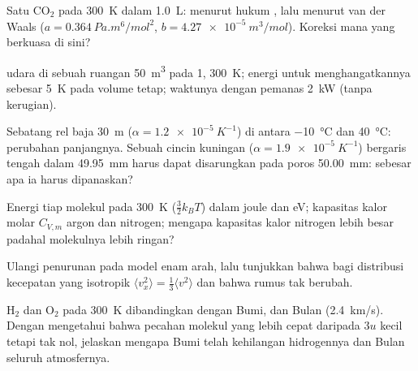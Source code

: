 \begin{exercise}[$\star\star$]\label{exo:b1:kinetic-theory:7}
Satu  CO$_2$ pada \qty{300}{K} dalam \qty{1.0}{L}:  menurut
hukum , lalu menurut van der Waals ($a = \qty{0.364}{Pa.m^6/mol^2}$,
$b = \qty{4.27e-5}{m^3/mol}$). Koreksi mana yang berkuasa di sini?
\end{exercise}

\begin{exercise}[$\star\star$]\label{exo:b1:kinetic-theory:8}
 udara di sebuah ruangan \qty{50}{m^3} pada \qty{1}{},
\qty{300}{K}; energi untuk menghangatkannya sebesar \qty{5}{K} pada volume tetap; waktunya
dengan pemanas \qty{2}{kW} (tanpa kerugian).
\end{exercise}

\begin{exercise}[$\star\star$]\label{exo:b1:kinetic-theory:9}
Sebatang rel baja \qty{30}{m} ($\alpha = \qty{1.2e-5}{K^{-1}}$) di antara
\qty{-10}{\degreeCelsius} dan \qty{40}{\degreeCelsius}: perubahan panjangnya.
Sebuah cincin kuningan ($\alpha = \qty{1.9e-5}{K^{-1}}$) bergaris tengah dalam
\qty{49.95}{mm} harus dapat disarungkan pada poros \qty{50.00}{mm}: sebesar apa ia
harus dipanaskan?
\end{exercise}

\begin{exercise}[$\star\star\star$]\label{exo:b1:kinetic-theory:10}
Energi tiap molekul pada \qty{300}{K} ($\tfrac32 k_BT$) dalam joule dan eV;
kapasitas kalor molar $C_{V,m}$ argon dan nitrogen; mengapa kapasitas kalor
nitrogen lebih besar padahal molekulnya lebih ringan?
\end{exercise}

\begin{exercise}[$\star\star\star$]\label{exo:b1:kinetic-theory:11}
Ulangi penurunan  pada model enam arah,
lalu tunjukkan bahwa bagi distribusi kecepatan yang isotropik $\langle v_x^2\rangle
= \tfrac13\langle v^2\rangle$ dan bahwa rumus  tak berubah.
\end{exercise}

\begin{exercise}[$\star\star\star$]\label{exo:b1:kinetic-theory:12}
 H$_2$ dan O$_2$ pada \qty{300}{K} dibandingkan dengan
 Bumi, dan  Bulan (\qty{2.4}{km/s}).
Dengan mengetahui bahwa pecahan molekul yang lebih cepat daripada $3u$ kecil tetapi tak
nol, jelaskan mengapa Bumi telah kehilangan hidrogennya dan Bulan seluruh
atmosfernya.
\end{exercise}

